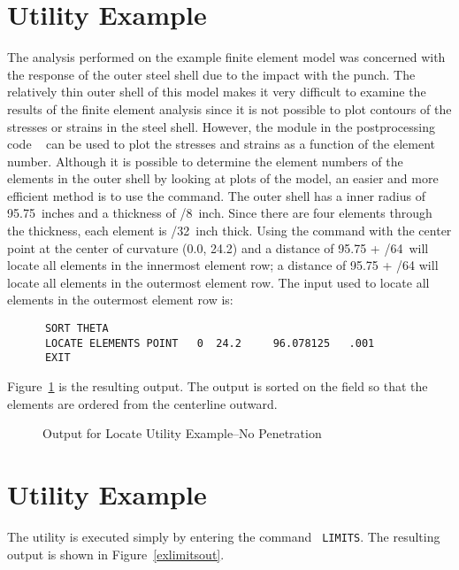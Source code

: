 \section{ Utility Example}

The analysis performed on the example finite element model was concerned
with the response of the outer steel shell due to the impact with the
punch.  The relatively thin outer shell of this model makes it very
difficult to examine the results of the finite element analysis since it
is not possible to plot contours of the stresses or strains in the steel
shell.  However, the  module in the postprocessing code
~\cite{BLOT} can be used to plot the stresses and strains as
a function of the element number.  Although it is possible to determine
the element numbers of the elements in the outer shell by looking at
plots of the model, an easier and more efficient method is to use the
 command.  The outer shell has a inner radius of
95.75~inches and a thickness of /8~inch.  Since there are four
elements through the thickness, each element is /{32}~inch thick.
Using the  command with the center point at the center
of curvature (0.0, 24.2) and a distance of 95.75 + /{64}\ will
locate all elements in the innermost element row; a distance of 95.75 +
/{64} will locate all elements in the outermost element row.
The input used to locate all elements in the outermost element row is:

\begin{verbatim}
      SORT THETA
      LOCATE ELEMENTS POINT   0  24.2     96.078125   .001
      EXIT
\end{verbatim}

Figure~\ref{exlocateout} is the resulting output.  The output is sorted
on the  field so that the elements are ordered from the
centerline outward. 

\begin{figure}

\caption{Output for Locate Utility Example--No Penetration}\label{exlocateout}
\end{figure}

\section{ Utility Example}
The  utility is executed simply by entering the command {\tt
LIMITS}.  The resulting output is shown in Figure~\ref{exlimitsout}.

